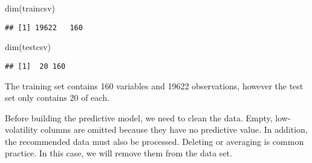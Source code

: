 \documentclass[
]{article}
\newenvironment{Shaded}{\begin{snugshade}}{\end{snugshade}}
\newcommand{\AttributeTok}[1]{\textcolor[rgb]{0.77,0.63,0.00}{#1}}
\newcommand{\DecValTok}[1]{\textcolor[rgb]{0.00,0.00,0.81}{#1}}
\newcommand{\FloatTok}[1]{\textcolor[rgb]{0.00,0.00,0.81}{#1}}
\newcommand{\FunctionTok}[1]{\textcolor[rgb]{0.00,0.00,0.00}{#1}}
\newcommand{\NormalTok}[1]{#1}
\newcommand{\OtherTok}[1]{\textcolor[rgb]{0.56,0.35,0.01}{#1}}
\newcommand{\SpecialCharTok}[1]{\textcolor[rgb]{0.00,0.00,0.00}{#1}}
\begin{document}
\begin{Shaded}
\begin{Highlighting}[]
\FunctionTok{dim}\NormalTok{(traincsv)}
\end{Highlighting}
\end{Shaded}

\begin{verbatim}
## [1] 19622   160
\end{verbatim}

\begin{Shaded}
\begin{Highlighting}[]
\FunctionTok{dim}\NormalTok{(testcsv)}
\end{Highlighting}
\end{Shaded}

\begin{verbatim}
## [1]  20 160
\end{verbatim}

The training set contains 160 variables and 19622 observations, however
the test set only contains 20 of each.

Before building the predictive model, we need to clean the data. Empty,
low-volatility columns are omitted because they have no predictive
value. In addition, the recommended data must also be processed.
Deleting or averaging is common practice. In this case, we will remove
them from the data set.

\begin{Shaded}
\end{Shaded}
\end{document}
